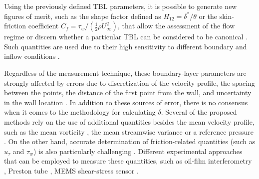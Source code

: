 Using the previously defined TBL parameters, it is possible to generate new figures of merit, such as the shape factor defined as $H_{12}=\delta^*/\theta$ or the skin-friction coefficient $C_f = \tau_w/(\frac{1}{2} \rho U_\infty^2)$, that allow the assessment of the flow regime or discern whether a particular TBL can be considered to be canonical \citep{Chauhan:2009p10824}. Such quantities are used due to their high sensitivity to different boundary and inflow conditions \citep{Chauhan:2009p10824}.

Regardless of the measurement technique, these boundary-layer parameters are  strongly affected by errors due to discretization of the velocity profile, the spacing between the points, the distance of the first point from the wall, and uncertainty in the wall location \citep{titchener2015calculation,Orlu:2010p36071}. In addition to these sources of error, there is no consensus when it comes to the methodology for calculating $\delta$. Several of the proposed methods rely on the use of additional quantities besides the mean velocity profile, such as the mean vorticity \citep{spalart1993experimental}, the mean streamwise variance \citep{Vinuesa:2016is} or a reference pressure \citep{griffin2020general}. On the other hand, accurate determination of friction-related quantities (such as $u_\tau$ and $\tau_w$) is also particularly challenging \citep{orlu2020instantaneous}. Different experimental approaches that can be employed to measure these quantities, such as oil-film interferometry \citep{Vinuesa:2016tn}, Preston tube \citep{head1962preston},  MEMS shear-stress sensor \citep{sheplak2004mems}.

